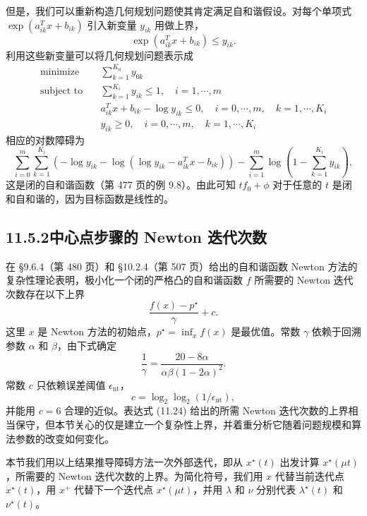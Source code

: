 \documentclass[UTF8, 12pt, fontset=fandol, oneside]{ctexart}
\begin{document}
但是，我们可以重新构造几何规划问题使其肯定满足自和谐假设。对每个单项式 $\exp(a_{ik}^Tx+b_{ik})$ 引入新变量 $y_{ik}$ 用做上界，
\[
\exp(a_{ik}^Tx+b_{ik})\leq y_{ik}.
\]
利用这些新变量可以将几何规划问题表示成
\[
\begin{aligned}
\text{minimize}\quad & \sum_{k=1}^{K_0}y_{0k}\\
\text{subject to}\quad & \sum_{k=1}^{K_i}y_{ik}\leq 1,\quad i=1,\cdots,m\\
& a_{ik}^Tx+b_{ik}-\log y_{ik}\leq 0,\quad i=0,\cdots,m,\quad k=1,\cdots,K_i\\
& y_{ik}\geq 0,\quad i=0,\cdots,m,\quad k=1,\cdots,K_i
\end{aligned}
\]
相应的对数障碍为
\[
\sum_{i=0}^m\sum_{k=1}^{K_i}\left(-\log y_{ik}-\log(\log y_{ik}-a_{ik}^Tx-b_{ik})\right)
-\sum_{i=1}^m\log\left(1-\sum_{k=1}^{K_i}y_{ik}\right),
\]
这是闭的自和谐函数（第 477 页的例 9.8）。由此可知 $tf_0+\phi$ 对于任意的 $t$ 是闭和自和谐的，因为目标函数是线性的。

\subsection*{11.5.2\quad 中心点步骤的 Newton 迭代次数}

在 \S9.6.4（第 480 页）和 \S10.2.4（第 507 页）给出的自和谐函数 Newton 方法的复杂性理论表明，极小化一个闭的严格凸的自和谐函数 $f$ 所需要的 Newton 迭代次数存在以下上界
\begin{equation}
\frac{f(x)-p^\star}{\gamma}+c.
\tag{11.24}
\end{equation}
这里 $x$ 是 Newton 方法的初始点，$p^\star=\inf_x f(x)$ 是最优值。常数 $\gamma$ 依赖于回溯参数 $\alpha$ 和 $\beta$，由下式确定
\[
\frac{1}{\gamma}=\frac{20-8\alpha}{\alpha\beta(1-2\alpha)^2}.
\]
常数 $c$ 只依赖误差阈值 $\epsilon_{\mathrm{nt}}$，
\[
c=\log_2\log_2(1/\epsilon_{\mathrm{nt}}),
\]
并能用 $c=6$ 合理的近似。表达式 (11.24) 给出的所需 Newton 迭代次数的上界相当保守，但本节关心的仅是建立一个复杂性上界，并着重分析它随着问题规模和算法参数的改变如何变化。

本节我们用以上结果推导障碍方法一次外部迭代，即从 $x^\star(t)$ 出发计算 $x^\star(\mu t)$，所需要的 Newton 迭代次数的上界。为简化符号，我们用 $x$ 代替当前迭代点 $x^\star(t)$，用 $x^+$ 代替下一个迭代点 $x^\star(\mu t)$，并用 $\lambda$ 和 $\nu$ 分别代表 $\lambda^\star(t)$ 和 $\nu^\star(t)$。
\end{document}
